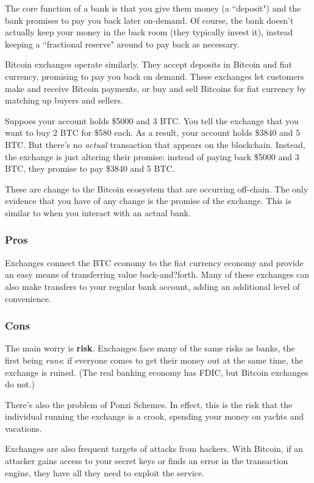 \documentclass[12pt]{article}
\begin{document}
The core function of a bank is that you give them money (a ``deposit") and the bank promises to pay you back later on-demand. Of course, the bank doesn't actually keep your money in the back room (they typically invest it), instead keeping a ``fractional reserve" around to pay back as necessary.

Bitcoin exchanges operate similarly. They accept deposits in Bitcoin and fiat currency, promising to pay you back on demand. These exchanges let customers make and receive Bitcoin payments, or buy and sell Bitcoins for fiat currency by matching up buyers and sellers.

Suppoes your account holds \$5000 and 3 BTC. You tell the exchange that you want to buy 2 BTC for \$580 each. As a result, your account holds \$3840 and 5 BTC. But there's no \textit{actual} transaction that appears on the blockchain. Instead, the exchange is just altering their promise: instead of paying back \$5000 and 3 BTC, they promise to pay \$3840 and 5 BTC.

These are change to the Bitcoin ecosystem that are occurring off-chain. The only evidence that you have of any change is the promise of the exchange. This is similar to when you interact with an actual bank.

\subsubsection*{Pros}

Exchanges connect the BTC economy to the fiat currency economy and provide an easy means of transferring value back-and?forth. Many of these exchanges can also make transfers to your regular bank account, adding an additional level of convenience.

\subsubsection*{Cons}

The main worry is \textbf{risk}. Exchanges face many of the same risks as banks, the first being \textit{runs}: if everyone comes to get their money out at the same time, the exchange is ruined. (The real banking economy has FDIC, but Bitcoin exchanges do not.)

There's also the problem of Ponzi Schemes. In effect, this is the risk that the individual running the exchange is a crook, spending your money on yachts and vacations.

Exchanges are also frequent targets of attacks from hackers. With Bitcoin, if an attacker gains access to your secret keys or finds an error in the transaction engine, they have all they need to exploit the service.
\end{document}
